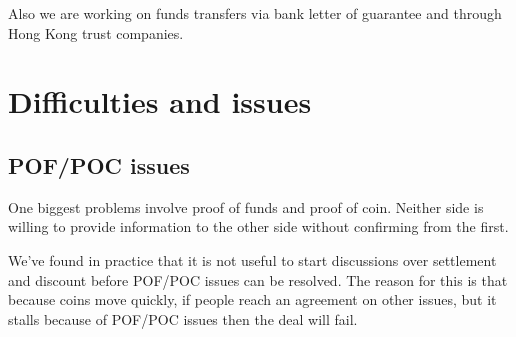 \documentclass[10pt]{article}
\begin{document}
Also we are working on funds transfers via bank letter of guarantee
and through Hong Kong trust companies.

\section{Difficulties and issues}

\subsection{POF/POC issues}

One biggest problems involve proof of funds and proof of coin.
Neither side is willing to provide information to the other side
without confirming from the first.

We've found in practice that it is not useful to start discussions
over settlement and discount before POF/POC issues can be resolved.
The reason for this is that because coins move quickly, if people
reach an agreement on other issues, but it stalls because of POF/POC
issues then the deal will fail.
\end{document}
